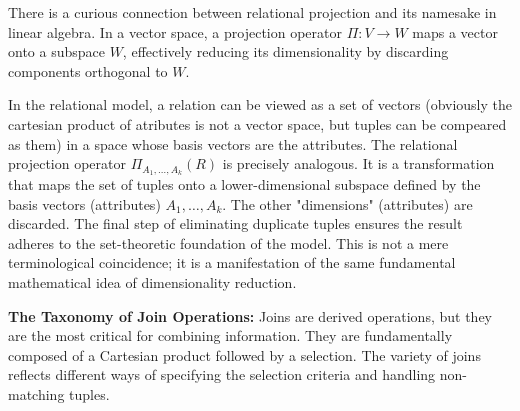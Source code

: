\begin{remark}[On Projections]
There is a curious connection between relational projection and its namesake in linear algebra. In a vector space, a projection operator $\Pi: V \to W$ maps a vector onto a subspace $W$, effectively reducing its dimensionality by discarding components orthogonal to $W$.

In the relational model, a relation can be viewed as a set of vectors (obviously the cartesian product of atributes is not a vector space, but tuples can be compeared as them) in a space whose basis vectors are the attributes. The relational projection operator $\Pi_{A_1, \dots, A_k}(R)$ is precisely analogous. It is a transformation that maps the set of tuples onto a lower-dimensional subspace defined by the basis vectors (attributes) $A_1, \dots, A_k$. The other "dimensions" (attributes) are discarded. The final step of eliminating duplicate tuples ensures the result adheres to the set-theoretic foundation of the model. This is not a mere terminological coincidence; it is a manifestation of the same fundamental mathematical idea of dimensionality reduction.
\end{remark}

\noindent\textbf{The Taxonomy of Join Operations:} Joins are derived operations, but they are the most critical for combining information. They are fundamentally composed of a Cartesian product followed by a selection. The variety of joins reflects different ways of specifying the selection criteria and handling non-matching tuples.

